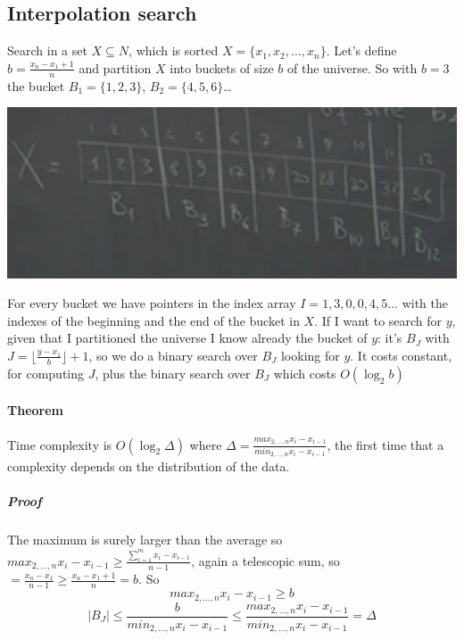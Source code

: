 \documentclass[10pt]{report}
\begin{document}
\subsection{Interpolation search} Search in a set $X \subseteq N$, which is sorted $X=\{x_1,x_2,\ldots,x_n\}$. Let's define $b = \frac{x_n - x_1 + 1}{n}$ and partition $X$ into buckets of size $b$ of the universe. So with $b= 3$ the bucket $B_1 = \{1,2,3\}$, $B_2 = \{4,5,6\}$\ldots
\begin{center}
	\includegraphics[scale=0.75]{10.png}
\end{center}
For every bucket we have pointers in the index array $I = 1,3,0,0,4,5\ldots$ with the indexes of the beginning and the end of the bucket in $X$. If I want to search for $y$, given that I partitioned the universe I know already the bucket of $y$: it's $B_J$ with $J = \lfloor\frac{y-x_1}{b}\rfloor + 1$, so we do a binary search over $B_J$ looking for $y$. It costs constant, for computing $J$, plus the binary search over $B_J$ which costs $O(\log_2 b)$
\paragraph{Theorem} Time complexity is $O(\log_2 \Delta)$ where $\Delta = \frac{max_{2,\ldots,n} x_i - x_{i-1}}{min_{2,\ldots,n} x_i - x_{i-1}}$, the first time that a complexity depends on the distribution of the data.
\subparagraph{Proof} The maximum is surely larger than the average so $max_{2,\ldots,n} x_i - x_{i-1} \geq \frac{\sum_{i=1}^m x_i - x_{i-1}}{n-1}$, again a telescopic sum, so $= \frac{x_n - x_1}{n-1} \geq \frac{x_n - x_1 + 1}{n} = b$. So $$max_{2,\ldots,n} x_i - x_{i-1} \geq b$$
$$|B_J| \leq \frac{b}{min_{2,\ldots,n} x_i - x_{i-1}} \leq \frac{max_{2,\ldots,n} x_i - x_{i-1}}{min_{2,\ldots,n} x_i - x_{i-1}} = \Delta$$

\end{document}
